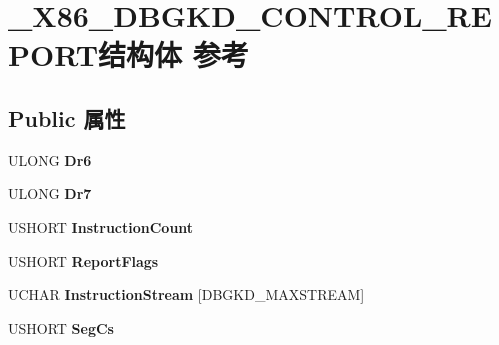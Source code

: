 \hypertarget{struct___x86___d_b_g_k_d___c_o_n_t_r_o_l___r_e_p_o_r_t}{}\section{\+\_\+\+X86\+\_\+\+D\+B\+G\+K\+D\+\_\+\+C\+O\+N\+T\+R\+O\+L\+\_\+\+R\+E\+P\+O\+R\+T结构体 参考}
\label{struct___x86___d_b_g_k_d___c_o_n_t_r_o_l___r_e_p_o_r_t}
\subsection*{Public 属性}
\begin{DoxyCompactItemize}
\item 
\mbox{\label{struct___x86___d_b_g_k_d___c_o_n_t_r_o_l___r_e_p_o_r_t_a572f7c348df0c3b762db99f05748f19b}} 
U\+L\+O\+NG {\bfseries Dr6}
\item 
\mbox{\label{struct___x86___d_b_g_k_d___c_o_n_t_r_o_l___r_e_p_o_r_t_aa3df699adcdfb7c351bda8a6b9012b87}} 
U\+L\+O\+NG {\bfseries Dr7}
\item 
\mbox{\label{struct___x86___d_b_g_k_d___c_o_n_t_r_o_l___r_e_p_o_r_t_a9585330e3bca1ae1220b67571c751e0c}} 
U\+S\+H\+O\+RT {\bfseries Instruction\+Count}
\item 
\mbox{\label{struct___x86___d_b_g_k_d___c_o_n_t_r_o_l___r_e_p_o_r_t_a821c36c5364256b954e6b78489cdfb4c}} 
U\+S\+H\+O\+RT {\bfseries Report\+Flags}
\item 
\mbox{\label{struct___x86___d_b_g_k_d___c_o_n_t_r_o_l___r_e_p_o_r_t_ac19d1b052bfe9da99f590d7b4bc58232}} 
U\+C\+H\+AR {\bfseries Instruction\+Stream} \mbox{[}D\+B\+G\+K\+D\+\_\+\+M\+A\+X\+S\+T\+R\+E\+AM\mbox{]}
\item 
\mbox{\label{struct___x86___d_b_g_k_d___c_o_n_t_r_o_l___r_e_p_o_r_t_a2b6b2707cf937e0ffa89a42c329626ee}} 
U\+S\+H\+O\+RT {\bfseries Seg\+Cs}

\end{DoxyCompactItemize}
